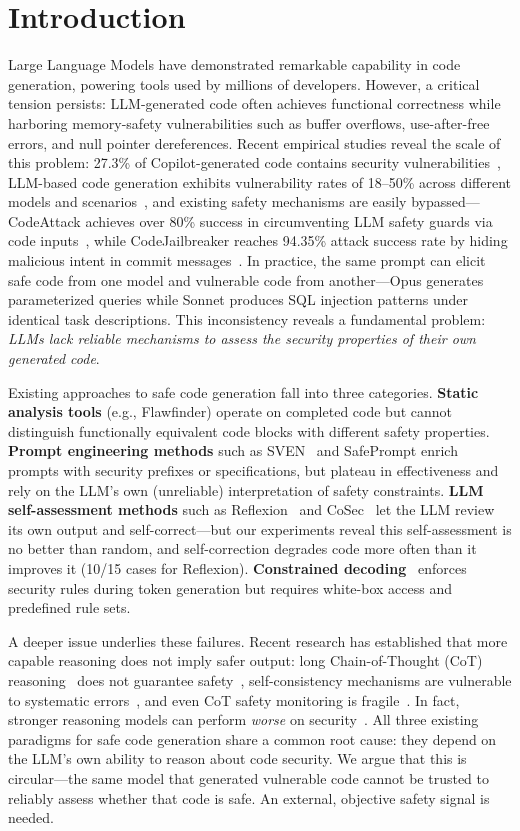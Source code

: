 \documentclass[10pt,conference]{IEEEtran}
\begin{document}
\section{Introduction}

Large Language Models have demonstrated remarkable capability in code generation, powering tools used by millions of developers. However, a critical tension persists: LLM-generated code often achieves functional correctness while harboring memory-safety vulnerabilities such as buffer overflows, use-after-free errors, and null pointer dereferences. Recent empirical studies reveal the scale of this problem: 27.3\% of Copilot-generated code contains security vulnerabilities~\cite{copilotsec}, LLM-based code generation exhibits vulnerability rates of 18--50\% across different models and scenarios~\cite{chromesecbench}, and existing safety mechanisms are easily bypassed---CodeAttack achieves over 80\% success in circumventing LLM safety guards via code inputs~\cite{codeattack}, while CodeJailbreaker reaches 94.35\% attack success rate by hiding malicious intent in commit messages~\cite{codejailbreaker}. In practice, the same prompt can elicit safe code from one model and vulnerable code from another---Opus generates parameterized queries while Sonnet produces SQL injection patterns under identical task descriptions. This inconsistency reveals a fundamental problem: \textit{LLMs lack reliable mechanisms to assess the security properties of their own generated code}.

Existing approaches to safe code generation fall into three categories. \textbf{Static analysis tools} (e.g., Flawfinder) operate on completed code but cannot distinguish functionally equivalent code blocks with different safety properties. \textbf{Prompt engineering methods} such as SVEN~\cite{sven} and SafePrompt enrich prompts with security prefixes or specifications, but plateau in effectiveness and rely on the LLM's own (unreliable) interpretation of safety constraints. \textbf{LLM self-assessment methods} such as Reflexion~\cite{reflexion} and CoSec~\cite{cosec} let the LLM review its own output and self-correct---but our experiments reveal this self-assessment is no better than random, and self-correction degrades code more often than it improves it (10/15 cases for Reflexion). \textbf{Constrained decoding}~\cite{constraineddecode} enforces security rules during token generation but requires white-box access and predefined rule sets.

A deeper issue underlies these failures. Recent research has established that more capable reasoning does not imply safer output: long Chain-of-Thought (CoT) reasoning~\cite{cot} does not guarantee safety~\cite{safechain}, self-consistency mechanisms are vulnerable to systematic errors~\cite{tooconsistent}, and even CoT safety monitoring is fragile~\cite{cotmonitor}. In fact, stronger reasoning models can perform \textit{worse} on security~\cite{chromesecbench,lrmsafety}. All three existing paradigms for safe code generation share a common root cause: they depend on the LLM's own ability to reason about code security. We argue that this is circular---the same model that generated vulnerable code cannot be trusted to reliably assess whether that code is safe. An external, objective safety signal is needed.
\end{document}
